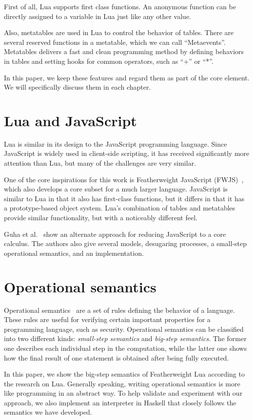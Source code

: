 First of all, Lua supports first class functions.
An anonymous function can be directly assigned to a variable in Lua just like any other value.

Also, metatables are used in Lua to control the behavior of tables.
There are several reserved functions in a metatable, which we can call ``Metaevents''.
Metatables delivers a fast and clean programming method by defining behaviors in tables and setting hooks for common operators, such as ``+'' or ``*''.

In this paper, we keep these features and regard them as part of the core element.
We will specifically discuss them in each chapter.

\section{Lua and JavaScript}
Lua is similar in its design to the JavaScript programming language.
Since JavaScript is widely used in client-side scripting,
it has received significantly more attention than Lua,
but many of the challenges are very similar.

One of the core inspirations for this work is Featherweight JavaScript (FWJS)~\cite{FWJS},
which also develops a core subset for a much larger language.
JavaScript is similar to Lua in that it also has first-class functions,
but it differs in that it has a prototype-based object system.
Lua's combination of tables and metatables provide similar functionality,
but with a noticeably different feel.

Guha et al.~\cite{EOJS} show an alternate approach for reducing JavaScript to a core calculus. The authors also give several models, desugaring processes, a small-step operational semantics, and an implementation.

\section{Operational semantics}
Operational semantics~\cite{AIOS} are a set of rules defining the behavior of a language.
These rules are useful for verifying certain important properties for a programming language, such as security.
Operational semantics can be classified into two different kinds: \emph{small-step semantics} and \emph{big-step semantics}. The former one describes each individual step in the computation, while the latter one shows how the final result of one statement is obtained after being fully executed.

In this paper, we show the big-step semantics of Featherweight Lua according to the research on Lua. Generally speaking, writing operational semantics is more like programming in an abstract way. To help validate and experiment with our approach, we also implement an interpreter in Haskell that closely follows the semantics we have developed.



